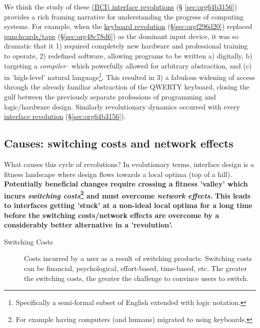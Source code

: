\documentclass[logo,bsc,singlespacing,parskip]{infthesis}
\begin{document}
We think the study of these \hyperref[sec:org64b3156]{(BCI) interface revolutions} (§  \ref{sec:org64b3156}) provides a rich framing narrative for understanding the progress of computing systems.
For example, when the \hyperref[sec:orgf296d20]{keyboard revolution} (\S \ref{sec:orgf296d20}) replaced  \hyperref[sec:org48c78d6]{punchcards/tape} (\S \ref{sec:org48c78d6}) as the dominant input device, it was so dramatic that it 1) required completely new hardware and professional training to operate, 2) redefined software, allowing programs to be written a) digitally, b) targeting a \emph{compiler}-- which powerfully allowed for arbitrary abstraction, and (c) in 'high-level' natural language\footnote{Specifically a semi-formal subset of English extended with logic notation.}. This resulted in 3) a fabulous widening of access through the already familiar abstraction of the QWERTY keyboard, closing the gulf between the previously separate professions of programming and logic/hardware design.
Similarly revolutionary dynamics occurred with every \hyperref[sec:org64b3156]{interface revolution} (\S \ref{sec:org64b3156}).
\subsection{Causes: switching costs and network effects}
\label{sec:org91d6eb6}
What causes this cycle of revolutions?
In evolutionary terms, interface design is a fitness landscape where design flows towards a local optima (top of a hill).
\textbf{Potentially beneficial changes require crossing a fitness 'valley' which incurs \emph{switching costs}\footnote{For example having computers (and humans) migrated to using keyboards.} and must overcome \emph{network effects}.}
\textbf{This leads to interfaces getting 'stuck' at a non-ideal local optima for a long time before the switching costs/network effects are overcome by a considerably better alternative in a 'revolution'.}

\begin{mdframed}
\begin{description}
\item[{Switching Costs\label{switching costs}}] Costs incurred by a user as a result of switching products.
Switching costs can be financial, psychological, effort-based, time-based, etc.
The greater the switching costs, the greater the challenge to convince users to switch.
\end{description}
\end{mdframed}
\end{document}
